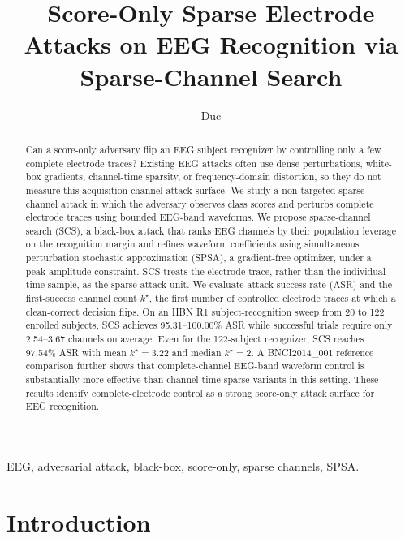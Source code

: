 \documentclass[journal]{IEEEtran}
\begin{document}
\title{Score-Only Sparse Electrode Attacks on EEG Recognition via Sparse-Channel Search}

\author{Duc}

\maketitle

\begin{abstract}
Can a score-only adversary flip an EEG subject recognizer by controlling only a few complete electrode traces? Existing EEG attacks often use dense perturbations, white-box gradients, channel-time sparsity, or frequency-domain distortion, so they do not measure this acquisition-channel attack surface. We study a non-targeted sparse-channel attack in which the adversary observes class scores and perturbs complete electrode traces using bounded EEG-band waveforms. We propose sparse-channel search (SCS), a black-box attack that ranks EEG channels by their population leverage on the recognition margin and refines waveform coefficients using simultaneous perturbation stochastic approximation (SPSA), a gradient-free optimizer, under a peak-amplitude constraint. SCS treats the electrode trace, rather than the individual time sample, as the sparse attack unit. We evaluate attack success rate (ASR) and the first-success channel count $k^\star$, the first number of controlled electrode traces at which a clean-correct decision flips. On an HBN R1 subject-recognition sweep from 20 to 122 enrolled subjects, SCS achieves 95.31--100.00\% ASR while successful trials require only 2.54--3.67 channels on average. Even for the 122-subject recognizer, SCS reaches 97.54\% ASR with mean $k^\star=3.22$ and median $k^\star=2$. A BNCI2014\_001 reference comparison further shows that complete-channel EEG-band waveform control is substantially more effective than channel-time sparse variants in this setting. These results identify complete-electrode control as a strong score-only attack surface for EEG recognition.
\end{abstract}

\begin{IEEEkeywords}
EEG, adversarial attack, black-box, score-only, sparse channels, SPSA.
\end{IEEEkeywords}

\section{Introduction}
\end{document}
